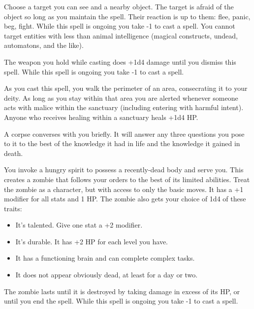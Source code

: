  Choose a target you can see and a nearby object. The target is afraid of the object so long as you maintain the spell. Their reaction is up to them: flee, panic, beg, fight. While this spell is ongoing you take -1 to cast a spell. You cannot target entities with less than animal intelligence (magical constructs, undead, automatons, and the like).





 The weapon you hold while casting does +1d4 damage until you dismiss this spell. While this spell is ongoing you take -1 to cast a spell.




 As you cast this spell, you walk the perimeter of an area, consecrating it to your deity. As long as you stay within that area you are alerted whenever someone acts with malice within the sanctuary (including entering with harmful intent). Anyone who receives healing within a sanctuary heals +1d4 HP\@.




 A corpse converses with you briefly. It will answer any three questions you pose to it to the best of the knowledge it had in life and the knowledge it gained in death.





 You invoke a hungry spirit to possess a recently-dead body and serve you. This creates a zombie that follows your orders to the best of its limited abilities. Treat the zombie as a character, but with access to only the basic moves. It has a +1 modifier for all stats and 1 HP\@. The zombie also gets your choice of 1d4 of these traits:
\begin{itemize}
\item It's talented. Give one stat a +2 modifier.
\item It's durable. It has +2 HP for each level you have.
\item It has a functioning brain and can complete complex tasks.
\item It does not appear obviously dead, at least for a day or two.

\end{itemize}


 The zombie lasts until it is destroyed by taking damage in excess of its HP, or until you end the spell. While this spell is ongoing you take -1 to cast a spell.


